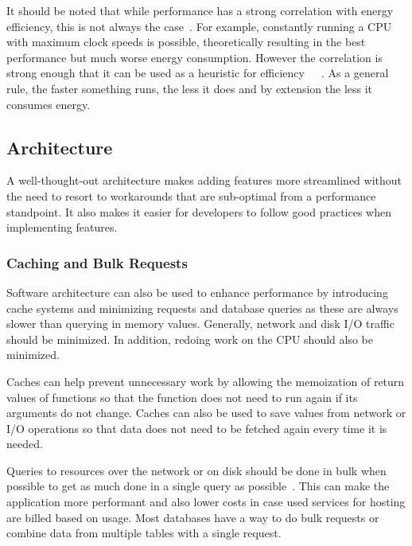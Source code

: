 It should be noted that while performance has a strong correlation with energy efficiency, this is not always the case~\cite{towardsgreenranking}. For example, constantly running a CPU with maximum clock speeds is possible, theoretically resulting in the best performance but much worse energy consumption. However the correlation is strong enough that it can be used as a heuristic for efficiency~\cite{studyoninfluenceofsoftware}~\cite{energyefficiencyanewconcern}~\cite{twinsorfalseffriends}. As a general rule, the faster something runs, the less it does and by extension the less it consumes energy.

\subsection{Architecture}\label{architecture}
A well-thought-out architecture makes adding features more streamlined without the need to resort to workarounds that are sub-optimal from a performance standpoint. It also makes it easier for developers to follow good practices when implementing features. 

\subsubsection{Caching and Bulk Requests}
Software architecture can also be used to enhance performance by introducing cache systems and minimizing requests and database queries as these are always slower than querying in memory values. Generally, network and disk I/O traffic should be minimized. In addition, redoing work on the CPU should also be minimized.

Caches can help prevent unnecessary work by allowing the memoization of return values of functions so that the function does not need to run again if its arguments do not change. Caches can also be used to save values from network or I/O operations so that data does not need to be fetched again every time it is needed. ~\cite{guidelines}

Queries to resources over the network or on disk should be done in bulk when possible to get as much done in a single query as possible~\cite{guidelines}. This can make the application more performant and also lower costs in case used services for hosting are billed based on usage. Most databases have a way to do bulk requests or combine data from multiple tables with a single request.

